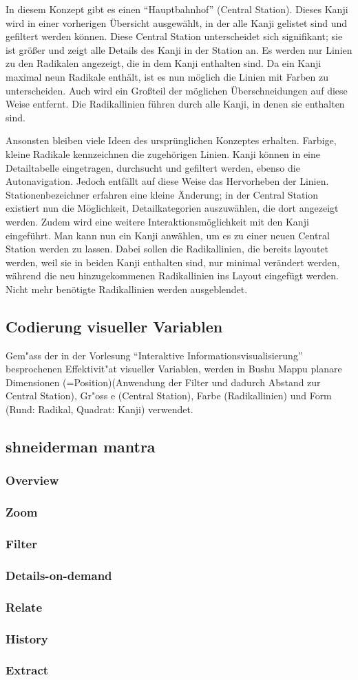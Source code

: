 In diesem Konzept gibt es einen "`Hauptbahnhof"' (Central Station). Dieses Kanji wird in einer vorherigen Übersicht ausgewählt, in der alle Kanji gelistet sind und gefiltert werden können. Diese Central Station unterscheidet sich signifikant; sie ist größer und zeigt alle Details des Kanji in der Station an. Es werden nur Linien zu den Radikalen angezeigt, die in dem Kanji enthalten sind. Da ein Kanji maximal neun Radikale enthält, ist es nun möglich die Linien mit Farben zu unterscheiden. Auch wird ein Großteil der möglichen Überschneidungen auf diese Weise entfernt. Die Radikallinien führen durch alle Kanji, in denen sie enthalten sind.

Ansonsten bleiben viele Ideen des ursprünglichen Konzeptes erhalten. Farbige, kleine Radikale kennzeichnen die zugehörigen Linien. Kanji können in eine Detailtabelle eingetragen, durchsucht und gefiltert werden, ebenso die Autonavigation. Jedoch entfällt auf diese Weise das Hervorheben der Linien. Stationenbezeichner erfahren eine kleine Änderung; in der Central Station existiert nun die Möglichkeit, Detailkategorien auszuwählen, die dort angezeigt werden. Zudem wird eine weitere Interaktionsmöglichkeit mit den Kanji eingeführt. Man kann nun ein Kanji anwählen, um es zu einer neuen Central Station werden zu lassen. Dabei sollen die Radikallinien, die bereits layoutet werden, weil sie in beiden Kanji enthalten sind, nur minimal verändert werden, während die neu hinzugekommenen Radikallinien ins Layout eingefügt werden. Nicht mehr benötigte Radikallinien werden ausgeblendet.

\subsection{Codierung visueller Variablen}
Gem"ass  der in der Vorlesung "`Interaktive Informationsvisualisierung"' besprochenen Effektivit"at visueller Variablen, werden in Bushu Mappu planare Dimensionen (=Position)(Anwendung der Filter und dadurch Abstand zur Central Station), Gr"oss e (Central Station), Farbe (Radikallinien) und Form (Rund: Radikal, Quadrat: Kanji) verwendet. 

\subsection{shneiderman mantra}
\subsubsection{Overview}
\subsubsection{Zoom}
\subsubsection{Filter}
\subsubsection{Details-on-demand}
\subsubsection{Relate}
\subsubsection{History}
\subsubsection{Extract}